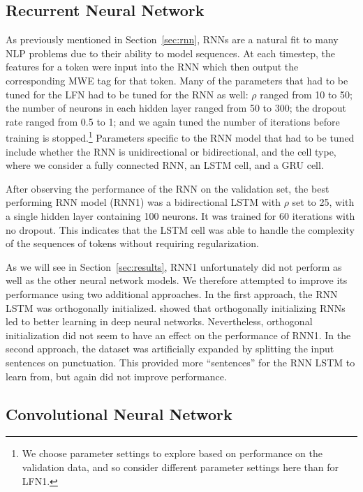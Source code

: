 \documentclass[11pt,a4paper]{article}
\newcommand{\secref}[1]{Section~\ref{#1}}
\begin{document}
\subsection{Recurrent Neural Network}

As previously mentioned in \secref{sec:rnn}, RNNs are a natural fit to
many NLP problems due to their ability to model sequences. At each
timestep, the features for a token were input into the RNN which then
output the corresponding MWE tag for that token.  Many of the
parameters that had to be tuned for the LFN had to be tuned for the
RNN as well: $\rho$ ranged from 10 to 50; the number of neurons in
each hidden layer ranged from 50 to 300; the dropout rate ranged from
0.5 to 1; and we again tuned the number of iterations before training
is stopped.\footnote{We choose parameter settings to explore based on
  performance on the validation data, and so consider different
  parameter settings here than for LFN1.} Parameters specific to the
RNN model that had to be tuned include whether the RNN is
unidirectional or bidirectional, and the cell type, where we consider
a fully connected RNN, an LSTM cell, and a GRU cell.

After observing the performance of the RNN on the validation set, the
best performing RNN model (RNN1) was a bidirectional LSTM with $\rho$
set to 25, with a single hidden layer containing 100 neurons. It was
trained for 60 iterations with no dropout. This indicates that the
LSTM cell was able to handle the complexity of the sequences of tokens
without requiring regularization. 


As we will see in \secref{sec:results}, RNN1 unfortunately did not
perform as well as the other neural network models. We therefore
attempted to improve its performance using two additional approaches.
In the first approach, the RNN LSTM was orthogonally
initialized.  showed that
orthogonally initializing RNNs led to better learning in deep neural
networks. Nevertheless, orthogonal initialization did not seem to have
an effect on the performance of RNN1. In the second approach, the
dataset was artificially expanded by splitting the input sentences on
punctuation. This provided more ``sentences'' for the RNN LSTM to
learn from, but again did not improve performance.

\subsection{Convolutional Neural Network}
\end{document}
